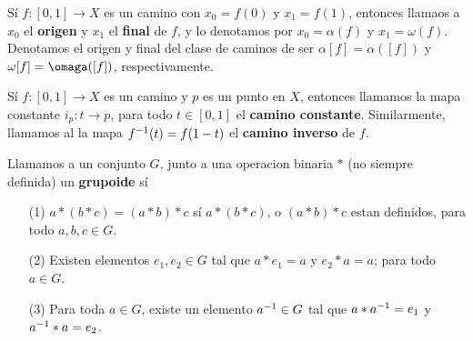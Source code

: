 \begin{definition}
    S\'i $f:[0,1] \xrightarrow{} X$ es un camino con $x_0=f(0)$ y $x_1=f(1)$,
    entonces llamaos a $x_0$ el \textbf{origen} y $x_1$ el \textbf{final} de
    $f$, y lo denotamos por  $x_0=\alpha(f)$ y $x_1=\omega(f)$. Denotamos el
    origen y final del clase de caminos de ser $\alpha[f]=\alpha([f])$ y
    $\omega[f]=\omaga([f])$, respectivamente.
\end{definition}

\begin{definition}
    S\'i $f:[0,1] \xrightarrow{} X$ es un camino y $p$ es un punto en  $X$,
    entonces llamamos la mapa constante  $i_p:t \xrightarrow{} p$, para todo $t
    \in [0,1]$ el \textbf{camino constante}. Similarmente, llamamos al la mapa
    $f^{-1}(t)=f(1-t)$ el \textbf{camino inverso} de $f$.
\end{definition}

\begin{definition}
    Llamamos a un conjunto $G$, junto a una operacion binaria $\ast$ (no
    siempre definida) un \textbf{grupoide} s\'i
    \begin{enumerate}
        \item[(1)] $a \ast (b \ast c)=(a \ast b) \ast c$ s\'i $a \ast (b \ast
            c)$, o $(a \ast b) \ast c$ estan definidos, para todo $a,b,c \in G$.

        \item[(2)] Existen elementos $e_1,e_2 \in G$ tal que $a \ast e_1=a$ y
            $e_2 \ast a=a$; para todo $a \in G$.

            \item[(3)] Para toda $a \in G$, existe un elemento  $a^{-1} \in G$
                tal que $a \ast a^{-1}=e_1$ y $a^{-1} \ast a=e_2$.
    \end{enumerate}
\end{definition}


